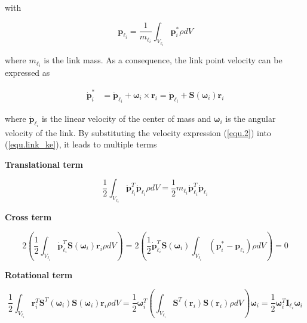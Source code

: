 \documentclass[10pt]{article}
\begin{document}
with

$$
\boldsymbol{p}_{\ell_{i}}=\frac{1}{m_{\ell_{i}}} \int_{V_{\ell_{i}}} \boldsymbol{p}_{i}^{*} \rho d V
$$





where $m_{\ell_{i}}$ is the link mass. As a consequence, the link point velocity can be expressed as

\begin{equation}\label{equ.2}
    \begin{aligned}
\dot{\boldsymbol{p}}_{i}^{*} & =\dot{\boldsymbol{p}}_{\ell_{i}}+\boldsymbol{\omega}_{i} \times \boldsymbol{r}_{i}  =\dot{\boldsymbol{p}}_{\ell_{i}}+\boldsymbol{S}\left(\boldsymbol{\omega}_{i}\right) \boldsymbol{r}_{i}
\end{aligned}
\end{equation}

where $\dot{\boldsymbol{p}}_{\ell_{i}}$ is the linear velocity of the center of mass and $\boldsymbol{\omega}_{i}$ is the angular velocity of the link. By substituting the velocity expression (\ref{equ.2}) into (\ref{equ.link_ke}), it leads to multiple terms

\textbf{Translational term}

$$
\frac{1}{2} \int_{V_{\ell_{i}}} \dot{\boldsymbol{p}}_{\ell_{i}}^{T} \dot{\boldsymbol{p}}_{\ell_{i}} \rho d V=\frac{1}{2} m_{\ell_{i}} \dot{\boldsymbol{p}}_{\ell_{i}}^{T} \dot{\boldsymbol{p}}_{\ell_{i}}
$$

\textbf{Cross term}

$$
2\left(\frac{1}{2} \int_{V_{\ell_{i}}} \dot{\boldsymbol{p}}_{\ell_{i}}^{T} \boldsymbol{S}\left(\boldsymbol{\omega}_{i}\right) \boldsymbol{r}_{i} \rho d V\right)=2\left(\frac{1}{2} \dot{\boldsymbol{p}}_{\ell_{i}}^{T} \boldsymbol{S}\left(\boldsymbol{\omega}_{i}\right) \int_{V_{\ell_{i}}}\left(\boldsymbol{p}_{i}^{*}-\boldsymbol{p}_{\ell_{i}}\right) \rho d V\right)=0
$$

\textbf{Rotational term}

$$
\frac{1}{2} \int_{V_{\ell_{i}}} \boldsymbol{r}_{i}^{T} \boldsymbol{S}^{T}\left(\boldsymbol{\omega}_{i}\right) \boldsymbol{S}\left(\boldsymbol{\omega}_{i}\right) \boldsymbol{r}_{i} \rho d V=\frac{1}{2} \boldsymbol{\omega}_{i}^{T}\left(\int_{V_{\ell_{i}}} \boldsymbol{S}^{T}\left(\boldsymbol{r}_{i}\right) \boldsymbol{S}\left(\boldsymbol{r}_{i}\right) \rho d V\right) \boldsymbol{\omega}_{i}=\frac{1}{2} \boldsymbol{\omega}_{i}^{T} \boldsymbol{I}_{\ell_{i}} \boldsymbol{\omega}_{i}
$$
\end{document}

